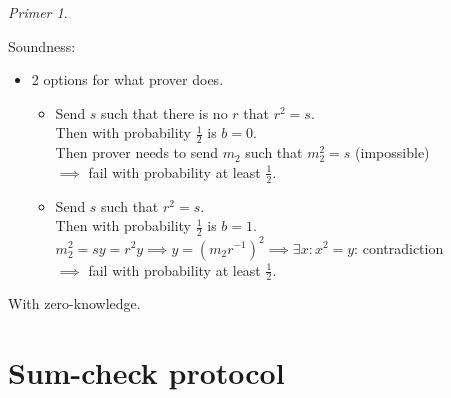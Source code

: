 \documentclass[a4paper, 12pt]{book}
\theoremstyle{definition}
\theoremstyle{remark}
\newtheorem*{ex}{Primer}
\begin{document}
\begin{ex}
\begin{itemize}[label={}]
\begin{itemize}[label={}]
    \end{itemize}
  \end{itemize}
  Soundness:
  \begin{itemize}
    \item 2 options for what prover does.
    \begin{itemize}
      \item Send $s$ such that there is no $r$ that $r^2 = s$. \\
        Then with probability $\frac{1}{2}$ is $b = 0$. \\
        Then prover needs to send $m_2$ such that $m_2^2 = s$ (impossible) \\
        $\implies$ fail with probability at least $\frac{1}{2}$.
      \item Send $s$ such that $r^2 = s$. \\
        Then with probability $\frac{1}{2}$ is $b = 1$. \\
        $m_2^2 = s y = r^2 y \implies y = (m_2 r^{-1})^2 \implies \exists x: x^2 = y$: contradiction \\
        $\implies$ fail with probability at least $\frac{1}{2}$.
    \end{itemize}
  \end{itemize}
  With zero-knowledge.
\end{ex}


\section{Sum-check protocol}
\end{document}
